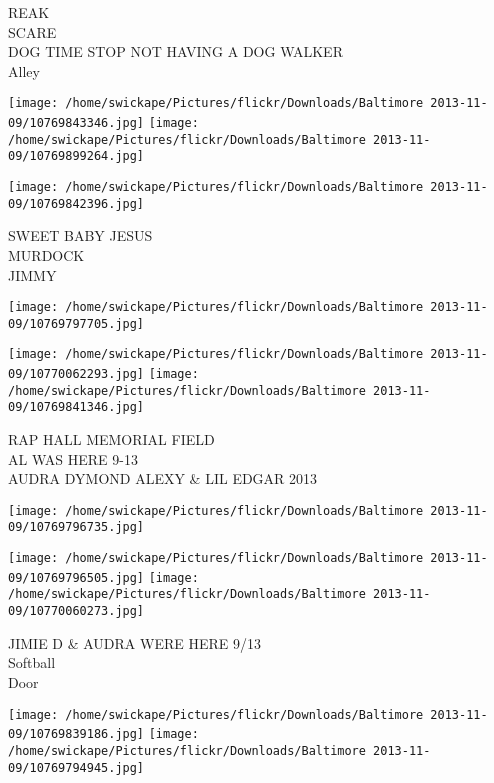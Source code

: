 \documentclass[10pt,letterpaper]{article}
\begin{document}
REAK\\
SCARE\\
DOG TIME STOP NOT HAVING A DOG WALKER\\
Alley\\
\pagebreak

\texttt{[image: /home/swickape/Pictures/flickr/Downloads/Baltimore 2013-11-09/10769843346.jpg]}
\texttt{[image: /home/swickape/Pictures/flickr/Downloads/Baltimore 2013-11-09/10769899264.jpg]}

\vspace{0.25in}
\texttt{[image: /home/swickape/Pictures/flickr/Downloads/Baltimore 2013-11-09/10769842396.jpg]}

SWEET BABY JESUS\\
MURDOCK\\
JIMMY\\
\pagebreak

\texttt{[image: /home/swickape/Pictures/flickr/Downloads/Baltimore 2013-11-09/10769797705.jpg]}

\vspace{0.25in}
\texttt{[image: /home/swickape/Pictures/flickr/Downloads/Baltimore 2013-11-09/10770062293.jpg]}
\texttt{[image: /home/swickape/Pictures/flickr/Downloads/Baltimore 2013-11-09/10769841346.jpg]}

RAP HALL MEMORIAL FIELD\\
AL WAS HERE 9{-}13\\
AUDRA DYMOND ALEXY \& LIL EDGAR 2013\\
\pagebreak

\texttt{[image: /home/swickape/Pictures/flickr/Downloads/Baltimore 2013-11-09/10769796735.jpg]}

\vspace{0.25in}
\texttt{[image: /home/swickape/Pictures/flickr/Downloads/Baltimore 2013-11-09/10769796505.jpg]}
\texttt{[image: /home/swickape/Pictures/flickr/Downloads/Baltimore 2013-11-09/10770060273.jpg]}

JIMIE D \& AUDRA WERE HERE 9/13\\
Softball\\
Door\\
\pagebreak

\texttt{[image: /home/swickape/Pictures/flickr/Downloads/Baltimore 2013-11-09/10769839186.jpg]}
\texttt{[image: /home/swickape/Pictures/flickr/Downloads/Baltimore 2013-11-09/10769794945.jpg]}
\end{document}
